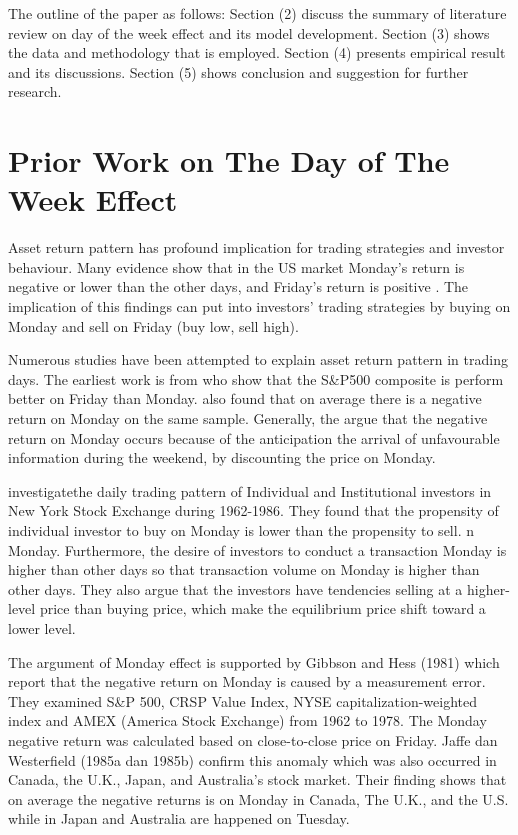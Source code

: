 \documentclass[12pt]{article}
\begin{document}
The outline of the paper as follows: Section (2) discuss the summary of literature review on day of the week effect and its model development. Section (3) shows the data and methodology that is employed. Section (4) presents empirical result and its discussions. Section (5) shows conclusion and suggestion for further research. 

\section*{Prior Work on The Day of The Week Effect} \label{sec:lit}

Asset return pattern has profound implication for trading strategies and investor behaviour. Many evidence show that in the US market Monday's return is negative or lower than the other days, and Friday's return is positive \citep{Cross1973,French1980,Lakonishok1988,keim1984}. The implication of this findings can put into investors' trading strategies by buying on Monday and sell on Friday (buy low, sell high).

Numerous studies have been attempted to explain asset return pattern in trading days. The earliest work is from \cite{Cross1973} who show that the S\&P500 composite is perform better on Friday than Monday. \cite{French1980} also found that on average there is a negative return on Monday on the same sample. Generally, the argue that the negative return on Monday occurs because of the anticipation the arrival of unfavourable information during the weekend, by discounting the price on Monday.

\cite{LAKONISHOK1990} investigatethe daily trading pattern of Individual and Institutional investors in New York Stock Exchange during 1962-1986. They found that the propensity of individual investor to buy on Monday is lower than the propensity to sell. n Monday. Furthermore, the desire of investors to conduct a transaction Monday  is higher than other days so that transaction volume on Monday is higher than other days. They also argue that the investors have tendencies selling at a higher-level price than buying price, which make the equilibrium price shift toward a lower level.

The argument of Monday effect is supported by Gibbson and Hess (1981) which report that the negative return on Monday is caused by a measurement error. They examined S\&P 500, CRSP Value Index, NYSE capitalization-weighted index and AMEX (America Stock Exchange) from 1962 to 1978. The Monday negative return was calculated based on close-to-close price on Friday. Jaffe dan Westerfield (1985a dan 1985b) confirm this anomaly which was also occurred in Canada, the U.K., Japan, and Australia’s stock market. Their finding shows that on average the negative returns is on Monday in Canada, The U.K., and the U.S. while in Japan and Australia are happened on Tuesday.
\end{document}
